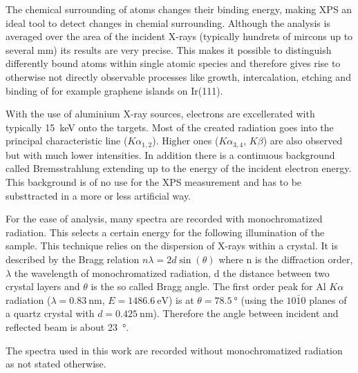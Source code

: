 The  chemical surrounding of atoms changes their binding energy, making XPS an ideal tool to detect changes in chemial surrounding. Although the analysis is averaged over the area of the incident X-rays (typically hundrets of mircons up to several mm) its results are very precise. This makes it possible to distinguish differently bound atoms within single atomic species and therefore gives rise to otherwise not directly observable processes like growth, intercalation, etching and binding of for example graphene islands on Ir(111)\cite{busse_graphene_2011-1,granas_oxygen_2012}.

With the use of aluminium X-ray sources, electrons are excellerated with typically \SI{15}{\keV} onto the targets. Most of the created radiation goes into the principal characteristic line ($K\alpha_{1,2}$). Higher ones ($K\alpha_{3,4}$, $K\beta$) are also observed but with much lower intensities. In addition there is a continuous background called Bremsstrahlung extending up to the energy of the incident electron energy. This background is of no use for the XPS measurement and has to be substtracted in a more or less artificial way.

For the ease of analysis, many spectra are recorded with monochromatized radiation. This selects a certain energy for the following illumination of the sample. This technique relies on the dispersion of X-rays within a crystal. It is described by the Bragg relation $n\lambda = 2d\sin(\theta)$ where n is the diffraction order, $\lambda$ the wavelength of monochromatized radiation, d the distance between two crystal layers and $\theta$ is the so called Bragg angle. The first order peak for Al $K\alpha$ radiation ($\lambda=\SI{0,83}{\nm}$, $E=\SI{1486,6}{\eV}$) is at $\theta=\SI{78.5}{\degree}$ (using the $10\bar10$ planes of a quartz crystal with $d=\SI{0,425}{\nm}$). Therefore the angle between incident and reflected beam is about \SI{23}{\degree}.\cite{Riviere_90}

The spectra used in this work are recorded without monochromatized radiation as not stated otherwise.

